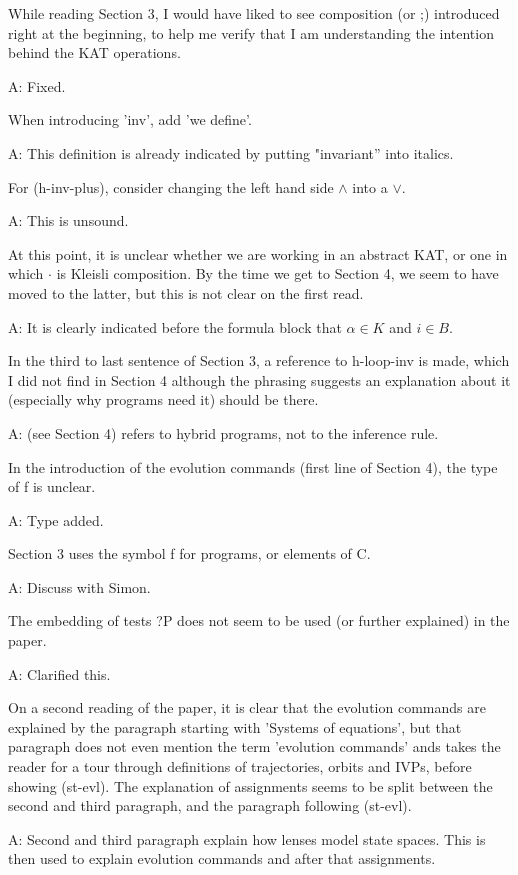\documentclass[envcountsame,envcountsect]{llncs}
\begin{document}
While reading Section 3, I would have liked to see composition (or ;) introduced right at the beginning, to help me verify that I am understanding the intention behind the KAT operations. 

A: Fixed.

When introducing 'inv', add 'we define'. 

A: This definition is already indicated by putting "invariant'' into italics.

For (h-inv-plus), consider changing the left hand side $\wedge$ into a $\vee$. 

A: This is unsound.

At this point, it is unclear whether we are working in an abstract KAT, or one in which $\cdot$ is Kleisli composition. By the time we get to Section 4, we seem to have moved to the latter, but this is not clear on the first read.

A: It is clearly indicated before the formula block that $\alpha\in K$ and $i\in B$.

In the third to last sentence of Section 3, a reference to h-loop-inv is made, which I did not find in Section 4 although the phrasing suggests an explanation about it (especially why programs need it) should be there.

A: (see Section 4) refers to hybrid programs, not to the inference rule.

In the introduction of the evolution commands (first line of Section 4), the type of f is unclear. 

A: Type added.

Section 3 uses the symbol f for programs, or elements of C. 

A: Discuss with Simon.

The embedding of tests ?P does not seem to be used (or further explained) in the paper. 

A: Clarified this.

On a second reading of the paper, it is clear that the evolution commands are explained by the paragraph starting with 'Systems of equations', but that paragraph does not even mention the term 'evolution commands' ands takes the reader for a tour through definitions of trajectories, orbits and IVPs, before showing (st-evl). The explanation of assignments seems to be split between the second and third paragraph, and the paragraph following (st-evl).

A: Second and third paragraph explain how lenses model state spaces. This is then used to explain evolution commands and after that assignments.
\end{document}
